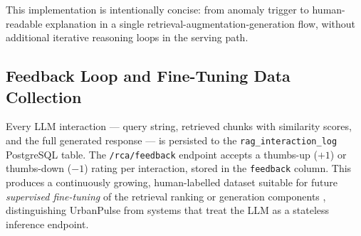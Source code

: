     This implementation is intentionally concise: from anomaly trigger to
    human-readable explanation in a single retrieval-augmentation-generation
    flow, without additional iterative reasoning loops in the serving path.
                                                                                                                                                          
  \subsection{Feedback Loop and Fine-Tuning Data Collection}                                                                                              
  \label{subsec:feedback}

  Every LLM interaction — query string, retrieved chunks with                                                                                             
  similarity scores, and the full generated response — is persisted
  to the \texttt{rag\_interaction\_log} PostgreSQL table. The                                                                                             
  \texttt{/rca/feedback} endpoint accepts a thumbs-up ($+1$) or                                                                                           
  thumbs-down ($-1$) rating per interaction, stored in the                                                                                                
  \texttt{feedback} column. This produces a continuously growing,                                                                                         
  human-labelled dataset suitable for future \textit{supervised                                                                                           
  fine-tuning} of the retrieval ranking or generation components                                                                                          
  \cite{rlhf_paper}, distinguishing UrbanPulse from systems that                                                                                          
  treat the LLM as a stateless inference endpoint.                                                                                                        
                                                                                                                                                          
